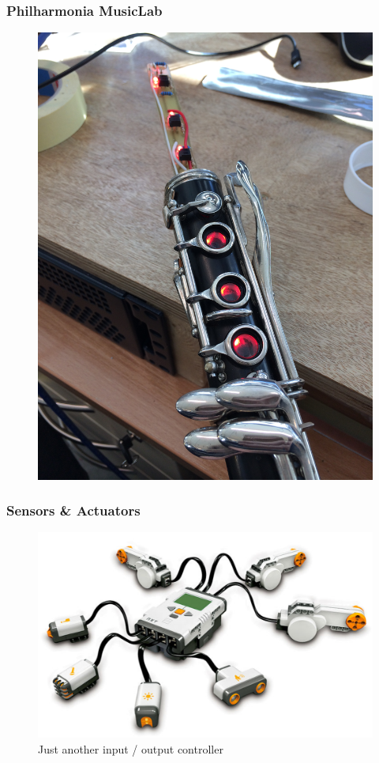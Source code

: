 \begin{frame}
	\frametitle{Philharmonia MusicLab}

	\begin{figure}
		\includegraphics[scale=.08]{assets/musiclab_05}
	\end{figure}

\end{frame}


\begin{frame}
	\frametitle{Sensors \& Actuators}
	\begin{figure}
		\includegraphics[scale=.15]{assets/nxt}  
		\caption{Just another input / output controller }
	\end{figure}
\end{frame}


